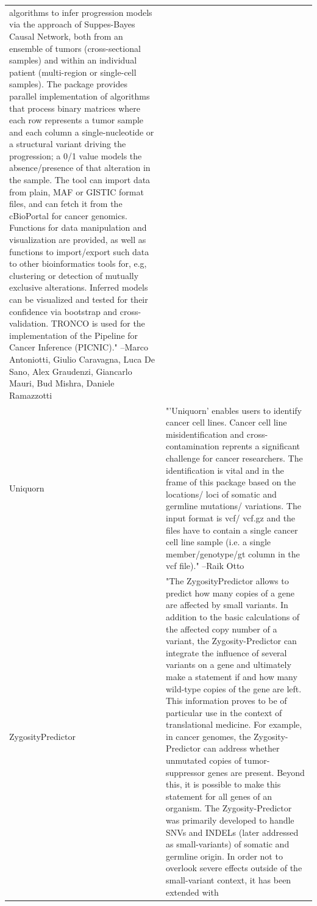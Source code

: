\documentclass[]{article}
\begin{document}
\begin{longtable}[t]{l>{\raggedright\arraybackslash}p{25em}}
algorithms to infer progression models via the approach of
Suppes-Bayes Causal Network, both from an ensemble of tumors
(cross-sectional samples) and within an individual patient
(multi-region or single-cell samples). The package provides
parallel implementation of algorithms that process binary
matrices where each row represents a tumor sample and each
column a single-nucleotide or a structural variant driving the
progression; a 0/1 value models the absence/presence of that
alteration in the sample. The tool can import data from plain,
MAF or GISTIC format files, and can fetch it from the
cBioPortal for cancer genomics. Functions for data manipulation
and visualization are provided, as well as functions to
import/export such data to other bioinformatics tools for, e.g,
clustering or detection of mutually exclusive alterations.
Inferred models can be visualized and tested for their
confidence via bootstrap and cross-validation. TRONCO is used
for the implementation of the Pipeline for Cancer Inference
(PICNIC)." --Marco Antoniotti, Giulio Caravagna, Luca De Sano, Alex Graudenzi, Giancarlo Mauri, Bud Mishra, Daniele Ramazzotti\\
Uniquorn & "'Uniquorn' enables users to identify cancer cell lines.
Cancer cell line misidentification and cross-contamination
reprents a significant challenge for cancer researchers. The
identification is vital and in the frame of this package based
on the locations/ loci of somatic and germline mutations/
variations. The input format is vcf/ vcf.gz and the files have
to contain a single cancer cell line sample (i.e. a single
member/genotype/gt column in the vcf file)." --Raik Otto\\
ZygosityPredictor & "The ZygosityPredictor allows to predict how many copies of
a gene are affected by small variants. In addition to the basic
calculations of the affected copy number of a variant, the
Zygosity-Predictor can integrate the influence of several
variants on a gene and ultimately make a statement if and how
many wild-type copies of the gene are left. This information
proves to be of particular use in the context of translational
medicine. For example, in cancer genomes, the
Zygosity-Predictor can address whether unmutated copies of
tumor-suppressor genes are present. Beyond this, it is possible
to make this statement for all genes of an organism. The
Zygosity-Predictor was primarily developed to handle SNVs and
INDELs (later addressed as small-variants) of somatic and
germline origin. In order not to overlook severe effects
outside of the small-variant context, it has been extended with

\end{longtable}
\end{document}
